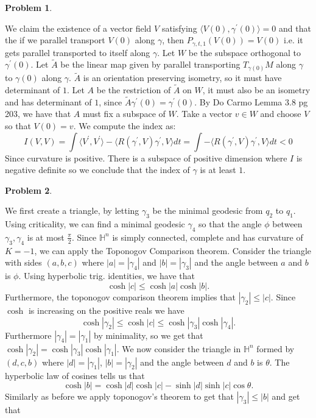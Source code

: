 \documentclass[12pt, a4paper]{article}
\title{}
\author{A.N.}
\date{\today}
\newtheorem{problem}{Problem}
\theoremstyle{definition}
\newcommand{\lan}{\langle}
\newcommand{\ran}{\rangle}
\newcommand{\inn}[1]{\lan#1\ran}
\begin{document}
\begin{problem}
\end{problem}
We claim the existence of a vector field $V$ satisfying $\inn{V(0), \gamma^\prime(0)} =0 $ and that the if we parallel transport $V(0)$ along $\gamma$, then $P_{\gamma , t , 1}(V(0)) = V(0)$ i.e. it gets parallel transported to itself along $\gamma$. Let $W$ be the subspace orthogonal to $\gamma^\prime(0)$. Let $\tilde{A}$ be the linear map given by parallel transporting $T_{\gamma(0)}M$ along $\gamma$ to $\gamma(0)$ along $\gamma$. $\tilde{A}$ is an orientation preserving isometry, so it must have determinant of  $1$. Let $A$ be the restriction of $\tilde{A}$ on $W$, it must also be an isometry and has determinant of $1$, since $\tilde{A} \gamma^\prime(0) = \gamma^\prime(0)$. By Do Carmo Lemma 3.8 pg 203, we have that $A$ must fix a subspace of $W$. Take a vector $v\in W$ and choose $V$ so that $V(0) = v$. We compute the index as: 
$$I(V,V) = \int \inn{V^\prime,V^\prime} - \inn{R(\gamma^\prime, V) \gamma^\prime , V} dt = \int - \inn{R(\gamma^\prime, V) \gamma^\prime , V} dt <0$$
Since curvature is positive. There is a subspace of positive dimension where $I$ is negative definite so we conclude that the index of $\gamma$ is at least $1$. 
 \newpage 
\begin{problem}
\end{problem}
We first create a triangle, by letting $\gamma_3$ be the minimal geodesic from $q_2$ to $q_1$. Using criticality, we can find a minimal geodesic $\gamma_4$ so that the angle $\phi$ between $\gamma_3,\gamma_4$ is at most $\frac{\pi}{2}$. Since $\mathbb{H}^n$ is simply connected, complete and has curvature of $K=-1$, we can apply the Toponogov Comparison theorem. Consider the triangle with sides $(a,b,c)$ where $|a| = |\gamma_4|$ and $|b| = |\gamma_3|$ and the angle between $a$ and $b$ is $\phi$. Using hyperbolic trig. identities, we have that 
$$\cosh|c| \leq \cosh|a| \cosh |b|.$$
Furthermore, the toponogov comparison theorem implies that $|\gamma_2| \leq |c|$. Since $\cosh$ is increasing on the positive reals we have
$$\cosh|\gamma_2| \leq \cosh|c| \leq \cosh |\gamma_3| \cosh |\gamma_4|.$$
Furthermore $|\gamma_4| = |\gamma_1|$ by minimality, so we get that $\cosh|\gamma_2| = \cosh |\gamma_3| \cosh|\gamma_1|$. 
We now consider the triangle in $\mathbb{H}^n$ formed by $(d,c,b)$ where $|d| = |\gamma_1|$, $|b| = |\gamma_2|$ and the angle between $d$ and $b$ is $\theta$. 
The hyperbolic law of cosines tells us that 
$$\cosh|b| = \cosh|d| \cosh|c| - \sinh |d|\sinh|c| \cos \theta. $$
Similarly as before we apply toponogov's theorem to get that $|\gamma_3|\leq |b|$ and get that 
\end{document}
